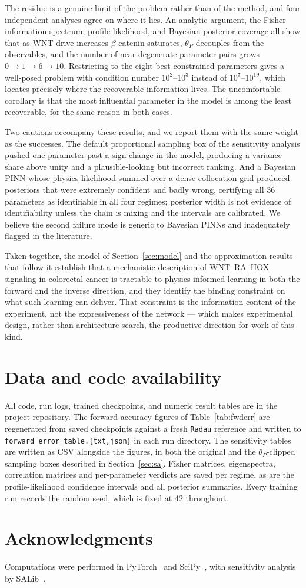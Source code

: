 \documentclass[11pt]{article}
\newcommand{\bcat}{$\beta$-\hspace{0pt}catenin}
\newcommand{\thP}{\theta_P}
\begin{document}
The residue is a genuine limit of the problem rather than of the method, and
four independent analyses agree on where it lies. An analytic argument, the
Fisher information spectrum, profile likelihood, and Bayesian posterior coverage
all show that as WNT drive increases \bcat{} saturates, $\thP$ decouples from
the observables, and the number of near-degenerate parameter pairs grows
$0 \to 1 \to 6 \to 10$. Restricting to the eight best-constrained parameters
gives a well-posed problem with condition number $10^{2}$--$10^{3}$ instead of
$10^{7}$--$10^{19}$, which locates precisely where the recoverable information
lives. The uncomfortable corollary is that the most influential parameter in the
model is among the least recoverable, for the same reason in both cases.

Two cautions accompany these results, and we report them with the same weight as
the successes. The default proportional sampling box of the sensitivity analysis
pushed one parameter past a sign change in the model, producing a variance share
above unity and a plausible-looking but incorrect ranking. And a Bayesian PINN
whose physics likelihood summed over a dense collocation grid produced posteriors
that were extremely confident and badly wrong, certifying all 36 parameters as
identifiable in all four regimes; posterior width is not evidence of
identifiability unless the chain is mixing and the intervals are calibrated. We
believe the second failure mode is generic to Bayesian PINNs and inadequately
flagged in the literature.

Taken together, the model of Section~\ref{sec:model} and the approximation
results that follow it establish that a mechanistic description of WNT--RA--HOX
signaling in colorectal cancer is tractable to physics-informed learning in both
the forward and the inverse direction, and they identify the binding constraint
on what such learning can deliver. That constraint is the information content of
the experiment, not the expressiveness of the network --- which makes
experimental design, rather than architecture search, the productive direction
for work of this kind.

\section*{Data and code availability}

All code, run logs, trained checkpoints, and numeric result tables are in the
project repository. The forward accuracy figures of Table~\ref{tab:fwderr} are
regenerated from saved checkpoints against a fresh \texttt{Radau} reference and
written to \texttt{forward\_error\_table.\{txt,json\}} in each run directory.
The sensitivity tables are written as CSV alongside the figures, in both the
original and the $\thP$-clipped sampling boxes described in
Section~\ref{sec:sa}. Fisher matrices, eigenspectra, correlation matrices and
per-parameter verdicts are saved per regime, as are the profile-likelihood
confidence intervals and all posterior summaries. Every training run records the
random seed, which is fixed at 42 throughout.

\section*{Acknowledgments}

Computations were performed in PyTorch~\citep{paszke2019pytorch} and
SciPy~\citep{virtanen2020scipy}, with sensitivity analysis by
SALib~\citep{herman2017salib}.



\end{document}
